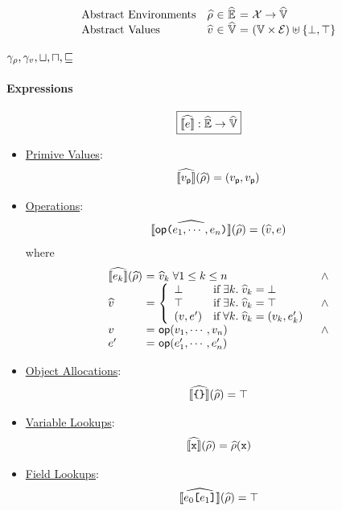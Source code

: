 \[
  \begin{array}{lr@{~}c@{~}l@{~}c@{~}l}
    \text{Abstract Environments} & \aenv &\in& \aenvset &=&
    \varset \rightarrow \avalset\\
    \text{Abstract Values} & \aval &\in& \avalset &=&
    (\valset \times \exprset) \uplus \{ \bot, \top \}\\
  \end{array}
\]

\todo $\gamma_\rho, \gamma_v, \sqcup, \sqcap, \sqsubseteq$

\paragraph{Expressions}
\[
  \framebox{$\asem{\expr}: \aenvset \rightarrow \avalset$}
\]
\begin{itemize}
  \item \underline{Primive Values}:
    \[
      \widehat{\llbracket{v_{\textsf{p}}}\rrbracket}(\widehat{\rho}) = (v_{\textsf{p}}, v_{\textsf{p}})
    \]
  \item \underline{Operations}:
    \[
      \widehat{\llbracket{\textsf{op}\texttt{(}e_1, \cdots, e_n \texttt{)}}\rrbracket}(\widehat{\rho}) =
      (\widehat{v}, e)
    \]
    where
    \[
      \begin{array}{l@{~}c@{~}ll}
        \asem{\expr_k}(\aenv) &=& \aval_k \; \forall 1 \leq k \leq n
        &\wedge\\
        \aval &=& \left\{
          \begin{array}{ll}
            \bot & \text{if} \; \exists k. \; \aval_k = \bot\\
            \top & \text{if} \; \exists k. \; \aval_k = \top\\
            (\val, \expr') &
            \text{if} \; \forall k. \; \aval_k = (\val_k, \expr'_k)\\
          \end{array}
        \right. &\wedge\\
        \val &=& \op(\val_1, \cdots, \val_n) &\wedge\\
        \expr' &=& \op(\expr'_1, \cdots, \expr'_n)\\
      \end{array}
    \]
  \item \underline{Object Allocations}:
    \[
      \widehat{\llbracket{\texttt{\{}\texttt{\}}}\rrbracket}(\widehat{\rho}) = \top
    \]
  \item \underline{Variable Lookups}:
    \[
      \widehat{\llbracket{\texttt{x}}\rrbracket}(\widehat{\rho}) = \widehat{\rho}(\texttt{x})
    \]
  \item \underline{Field Lookups}:
    \[
      \widehat{\llbracket{e_0 \texttt{[}e_1 \texttt{]}}\rrbracket}(\widehat{\rho}) = \top
    \]
\end{itemize}
